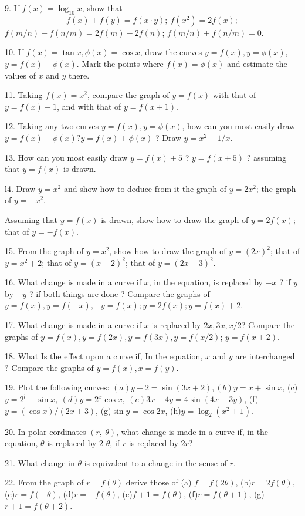 \documentclass[12pt]{article}
\begin{document}
9. If $f(x)=\log_{10}x$, show that
$$
f(x)+f(y)=f(x\cdot y);\ f(x^{2})=2f(x);
$$
$f(m/n)-f(n/m)=2f(m)-2f(n)$; $f(m/n)+f(n/m)=0$.

10. If $f(x)=\tan x, \phi(x)=\cos x$, draw the curves $y=f(x), y=\phi(x)$,
$y=f(x)-\phi(x)$. Mark the points where $f(x)=\phi(x)$ and estimate the
values of $x$ and $y$ there.

11. Taking $f(x)=x^{2}$, compare the graph of $y=f(x)$ with that of
$y=f(x)+1$, and with that of $y=f(x+1)$.

12. Taking any two curves $y=f(x), y=\phi(x)$, how can you most
easily draw $y=f(x)-\phi(x)? y=f(x)+\phi(x)$ ? Draw $y=x^{2}+1/x$.


13. How can you most easily draw $y=f(x)+ 5$ ? $y=f(x+5)$ ? 
assuming that $y=f(x)$ is drawn.

l4. Draw $y=x^{2}$ and show how to deduce from it the graph of
$y=2x^{2}$; the graph of $y=-x^{2}$.

Assuming that $y=f(x)$ is drawn, show how to draw the graph of
$y=2f(x)$; that of $y=-f(x)$.

15. From the graph of $y=x^{2}$, show how to draw the graph of
$y=(2x)^{2}$; that of $y=x^{2}+2$; that of $y=(x+2)^{2}$;
that of $y=(2x-3)^{2}$.

16. What change is made in a curve if $x$, in the equation, is replaced
by $-x$ ? if $y$ by $-y$ ? if both things are done ? Compare the graphs of
$y=f(x), y=f(-x), -y=f(x);y=2f(x);y=f(x)+2$.

17. What change is made in a curve if $x$ is replaced by $2x, 3x, x/2$?
Compare the graphs of $y=f(x), y=f(2x), y=f(3x), y=f(x/2)$;
$y=f(x+2)$.

18. What Is the effect upon a curve if, In the equation, $x$ and $y$ are
interchanged ? Compare the graphs of $y=f(x), x=f(y)$.

19. Plot the following curves: $(a)y+2=\sin(3x+2), (b)y=x+\sin x$,
(c) $y=2^{l}-\sin x,\ (d)y=2^x\cos x,\ (e)3x+4y=4\sin(4x-3y)$,
(f) $y=(\cos x)/(2x+3)$, (g)$\sin y=\cos 2x$, (h)$y=\log_{2}(x^{2}+1)$.

20. In polar cordinates $(r,\ \theta)$, what change is made in a curve if, in
the equation, $\theta$ is replaced by 2 $\theta$, if $r$ is replaced by $2r$?

21. What change in $\theta$ is equivalent to a change in the sense of $r$.

22. From the graph of $r=f(\theta)$ derive those of (a) $f=f(2\theta)$,
(b)$r=2f(\theta)$, (c)$r=f(-\theta)$, (d)$r=-f(\theta)$, (e)$f+1=f(\theta)$,
(f)$r=f(\theta+1)$, (g)$r+1=f(\theta+2)$.
\end{document}
